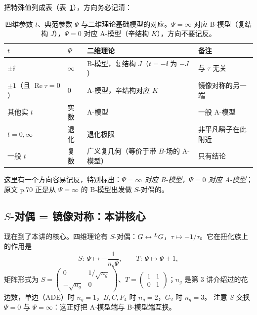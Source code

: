 把特殊值列成表（表~\ref{tab:psi-2d}），方向务必记清：
\begin{table}[htbp]
\centering
\caption{四维参数 $t$、典范参数 $\Psi$ 与二维理论基础模型的对应。$\Psi=\infty$ 对应 B-模型（复结构 $J$），$\Psi=0$ 对应 A-模型（辛结构 $K$），方向不要记反。}
\label{tab:psi-2d}
\begin{tabular}{@{}llll@{}}
\toprule
$t$ & $\Psi$ & 二维理论 & 备注 \\
\midrule
$\pm\ii$ & $\infty$ & B-模型，复结构 $J$（$t=-\ii$ 为 $-J$） & 与 $\tau$ 无关 \\
$\pm1$（且 $\operatorname{Re}\tau=0$） & $0$ & A-模型，辛结构对应 $K$ & 镜像对称的另一端 \\
其他实 $t$ & 实数 & A-模型 & 一般 A-模型 \\
$t=0,\infty$ & 退化 & 退化极限 & 非平凡瞬子在此附近 \\
一般 $t$ & 复数 & 广义复几何（等价于带 $B$-场的 A-模型） & 只有结论 \\
\bottomrule
\end{tabular}
\end{table}
 这里有一个方向容易记反，特别标出：\emph{$\Psi=\infty$ 对应 B-模型，$\Psi=0$ 对应 A-模型}；原文 p.70 正是从 $\Psi=\infty$ 的 B-模型出发做 $S$-对偶的。

\subsection{$S$-对偶 = 镜像对称：本讲核心}

现在到了本讲的核心。四维理论有 $S$-对偶：$G\leftrightarrow{}^{L}G$，$\tau\mapsto-1/\tau$。它在扭化族上的作用是
\begin{equation}
S:\ \Psi\longmapsto-\frac{1}{n_g\Psi},\qquad
T:\ \Psi\longmapsto\Psi+1,
\label{eq:S-T-2}
\end{equation}
矩阵形式为 $S=\begin{pmatrix}0&1/\sqrt{n_g}\\ -\sqrt{n_g}&0\end{pmatrix}$、$T=\begin{pmatrix}1&1\\0&1\end{pmatrix}$；$n_g$ 是第 3 讲介绍过的花边数，单边（ADE）时 $n_g=1$，$B,C,F_4$ 时 $n_g=2$，$G_2$ 时 $n_g=3$。 注意 $S$ 交换 $\Psi=0$ 与 $\Psi=\infty$：这正好把 A-模型端与 B-模型端互换。

